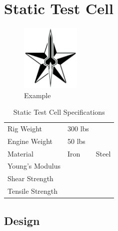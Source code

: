 \documentclass[10pt,a4paper]{article}
\begin{document}
	
\section{Static Test Cell}

\begin{figure}[h!]
	\centering
	\includegraphics[width=0.25\textwidth]{./figs/logo_srt.png}
	\caption{Example}
	\label{fig:example}
\end{figure}


\begin{table}[h!]
		\centering
		\begin{tabular}{l l l}
			Rig Weight & 300 lbs  \\
			Engine Weight & 50 lbs  \\
			Material  & Iron & Steel \\
			Young's Modulus \\
			Shear Strength \\
			Tensile Strength \\
		\end{tabular}
		\caption{Static Test Cell Specifications}
		\label{tab:example}
\end{table}
\subsection{Design}
\end{document}
